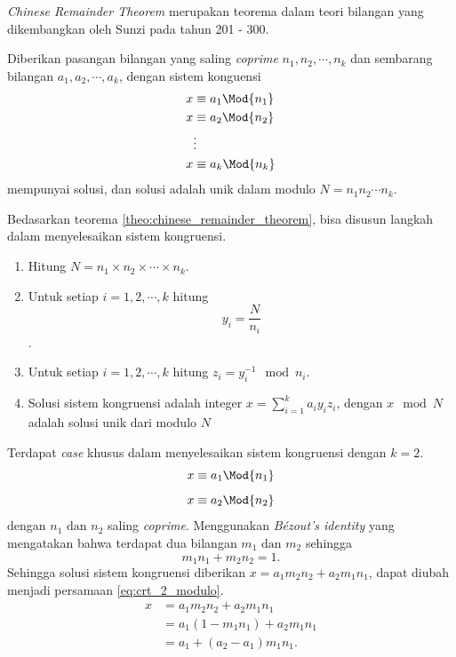 \textit{Chinese Remainder Theorem} merupakan teorema dalam teori bilangan yang dikembangkan oleh Sunzi pada tahun 201 - 300.
\begin{theo}
	\label{theo:chinese_remainder_theorem}
	Diberikan pasangan bilangan yang saling \textit{coprime} $n_1, n_2, \cdots, n_k$ dan sembarang bilangan $ a_1, a_2, \cdots, a_k $, dengan sistem konguensi 
	\begin{equation}
		\begin{aligned}
		x &\equiv a_1 \Mod{n_1}\\
		x &\equiv a_2 \Mod{n_2}\\
		& \vdots\\
		x &\equiv a_k \Mod{n_k}\\
		\end{aligned}
	\end{equation}
	mempunyai solusi, dan solusi adalah unik dalam modulo $ N = n_1n_2\cdots n_k$.
\end{theo}
Bedasarkan teorema \ref{theo:chinese_remainder_theorem}, bisa disusun langkah dalam menyelesaikan sistem kongruensi\cite{brilliant_crt}. 
\begin{enumerate}
	\item Hitung $ N = n_1 \times n_2 \times \cdots \times n_k$.
	\item Untuk setiap $ i = 1,2,\cdots,k $ hitung $$ y_i = \frac{N}{n_i} $$.
	\item Untuk setiap $ i = 1,2,\cdots,k $ hitung $ z_i = y_i^{-1} \mod{n_i} $.
	\item Solusi sistem kongruensi adalah integer $ x = \sum_{i=1}^{k} a_i y_i z_i $, dengan $ x \mod{N} $ adalah solusi unik dari modulo $ N $
\end{enumerate}
Terdapat \textit{case} khusus dalam menyelesaikan sistem kongruensi dengan $ k = 2 $.
$$ x \equiv a_1 \Mod{n_1} $$
$$ x \equiv a_2 \Mod{n_2} $$
dengan $ n_1 \text{ dan } n_2 $ saling \textit{coprime}.
Menggunakan \textit{Bézout's identity} yang mengatakan bahwa terdapat dua bilangan $ m_1 \text{ dan } m_2 $ sehingga 
\begin{equation}
	m_1 n_1 + m_2 n_2 = 1.
	\label{eq:bezeout_identity}
\end{equation}
Sehingga solusi sistem kongruensi diberikan $ x = a_1 m_2 n_2 + a_2 m_1 n_1 $, dapat diubah menjadi persamaan \eqref{eq:crt_2_modulo}.
\begin{equation}
	\begin{aligned}
		x &= a_1 m_2 n_2 +a_2 m_1n_1 \\
		  &= a_1 (1-m_1 n_1) + a_2 m_1 n_1 \\
		  &= a_1 +( a_2-a_1) m_1 n_1.
	\end{aligned}
	\label{eq:crt_2_modulo}
\end{equation}

